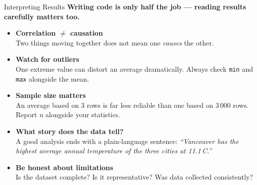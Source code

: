\documentclass{csbeamer}
\begin{document}
\begin{frame}{Interpreting Results}
    \textbf{Writing code is only half the job --- reading results carefully matters too.}

    \vspace{0.8em}

    \begin{itemize}
        \item<1-> \textcolor{stfxblue}{\textbf{Correlation $\neq$ causation}} \\
            {\small Two things moving together does not mean one \textit{causes} the other.}

        \vspace{0.4em}

        \item<2-> \textcolor{marigold}{\textbf{Watch for outliers}} \\
            {\small One extreme value can distort an average dramatically. Always check \texttt{min} and \texttt{max} alongside the mean.}

        \vspace{0.4em}

        \item<3-> \textcolor{stfxblue}{\textbf{Sample size matters}} \\
            {\small An average based on 3 rows is far less reliable than one based on 3\,000 rows. Report \textit{n} alongside your statistics.}

        \vspace{0.4em}

        \item<4-> \textcolor{marigold}{\textbf{What story does the data tell?}} \\
            {\small A good analysis ends with a plain-language sentence: \textit{``Vancouver has the highest average annual temperature of the three cities at 11.1\,\textdegree{}C.''}}

        \vspace{0.4em}

        \item<5-> \textcolor{stfxblue}{\textbf{Be honest about limitations}} \\
            {\small Is the dataset complete? Is it representative? Was data collected consistently?}
    \end{itemize}
\end{frame}
\end{document}
